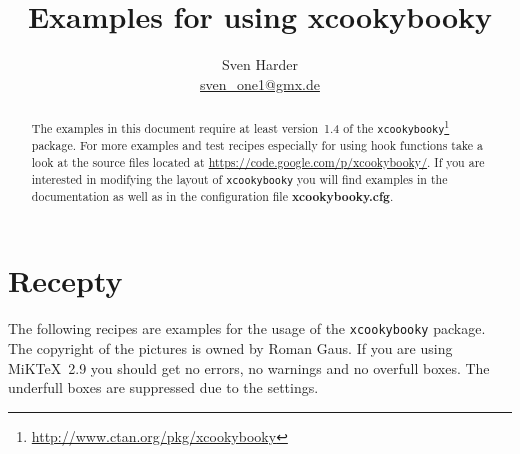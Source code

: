 \documentclass[%
a4paper,
11pt
]{article}
\begin{document}
\title{Examples for using \textbf{xcookybooky}}
\author{Sven Harder\\ \href{mailto:sven\_one1@gmx.de}{sven\_one1@gmx.de}}
\maketitle

\begin{abstract}
    \noindent The examples in this document require at least version~1.4 of the \texttt{xcookybooky}\footnote{\url{http://www.ctan.org/pkg/xcookybooky}} package. For more examples and test recipes especially for using hook functions take a look at the source files located at \url{https://code.google.com/p/xcookybooky/}. If you are interested in modifying the layout of \texttt{xcookybooky} you will find examples in the documentation as well as in the configuration file \textbf{xcookybooky.cfg}.
\end{abstract}

\tableofcontents

\vspace{5em}

\section{Recepty}
The following recipes are examples for the usage of the \texttt{xcookybooky} package. The copyright of the pictures is owned by Roman Gaus. If you are using MiKTeX~2.9 you should get no errors, no warnings and no overfull boxes. The underfull boxes are suppressed due to the settings.


%






\end{document}
